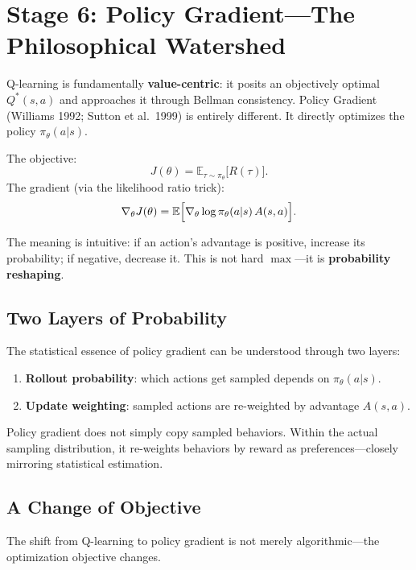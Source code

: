 \section{Stage 6: Policy Gradient---The Philosophical Watershed}
\label{sec:stage6-pg}

Q-learning is fundamentally \textbf{value-centric}: it posits an objectively optimal $Q^{\ast}(s,a)$ and approaches it through Bellman consistency.
Policy Gradient (Williams 1992; Sutton et al.\ 1999) is entirely different.
It directly optimizes the policy $\pi_\theta(a|s)$.

The objective:
\begin{equation}
J(\theta) = \mathbb{E}_{\tau \sim \pi_\theta}\bigl[R(\tau)\bigr].
\end{equation}
The gradient (via the likelihood ratio trick):
\begin{equation}
\label{eq:pg}
\nabla_\theta J(\theta) = \mathbb{E}\Bigl[\nabla_\theta \log \pi_\theta(a|s)\, A(s,a)\Bigr].
\end{equation}

The meaning is intuitive: if an action's advantage is positive, increase its probability; if negative, decrease it.
This is not hard $\max$---it is \textbf{probability reshaping}.

\subsection{Two Layers of Probability}

The statistical essence of policy gradient can be understood through two layers:
\begin{enumerate}
    \item \textbf{Rollout probability}: which actions get sampled depends on $\pi_\theta(a|s)$.
    \item \textbf{Update weighting}: sampled actions are re-weighted by advantage $A(s,a)$.
\end{enumerate}
Policy gradient does not simply copy sampled behaviors.
Within the actual sampling distribution, it re-weights behaviors by reward as preferences---closely mirroring statistical estimation.

\subsection{A Change of Objective}

The shift from Q-learning to policy gradient is not merely algorithmic---the optimization objective changes.

